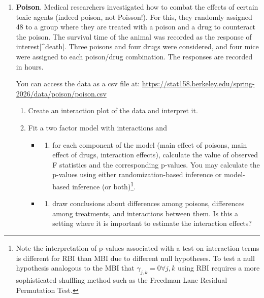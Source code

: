 \documentclass[
  letterpaper,
  DIV=11,
  numbers=noendperiod]{scrartcl}
\providecommand{\tightlist}{%
  \setlength{\itemsep}{0pt}\setlength{\parskip}{0pt}}
\begin{document}
\begin{enumerate}
\def\labelenumi{\arabic{enumi}.}
\setcounter{enumi}{2}
\item
  \textbf{Poison}. Medical researchers investigated how to combat the
  effects of certain toxic agents (indeed poison, not Poisson!). For
  this, they randomly assigned 48 to a group where they are treated with
  a poison and a drug to counteract the poison. The survival time of the
  animal was recorded as the response of interest{[}\^{}death{]}. Three
  poisons and four drugs were considered, and four mice were assigned to
  each poison/drug combination. The responses are recorded in hours.

  You can access the data as a csv file at:
  \url{https://stat158.berkeley.edu/spring-2026/data/poison/poison.csv}

  \begin{enumerate}
  \def\labelenumii{\alph{enumii}.}
  \tightlist
  \item
    Create an interaction plot of the data and interpret it.
  \item
    Fit a two factor model with interactions and

    \begin{itemize}
    \tightlist
    \item
      \begin{enumerate}
      \def\labelenumiii{\roman{enumiii}.}
      \tightlist
      \item
        for each component of the model (main effect of poisons, main
        effect of drugs, interaction effects), calculate the value of
        observed F statistics and the corresponding p-values. You may
        calculate the p-values using either randomization-based
        inference or model-based inference (or both)\footnote{Note the
          interpretation of p-values associated with a test on
          interaction terms is different for RBI than MBI due to
          different null hypotheses. To test a null hypothesis analogous
          to the MBI that \(\gamma_{j,k} = 0 \forall j,k\) using RBI
          requires a more sophisticated shuffling method such as the
          Freedman-Lane Residual Permutation Test.}.
      \end{enumerate}
    \item
      \begin{enumerate}
      \def\labelenumiii{\roman{enumiii}.}
      \setcounter{enumiii}{1}
      \tightlist
      \item
        draw conclusions about differences among poisons, differences
        among treatments, and interactions between them. Is this a
        setting where it is important to estimate the interaction
        effects?
      \end{enumerate}
    \end{itemize}
  \end{enumerate}
\end{enumerate}
\end{document}
